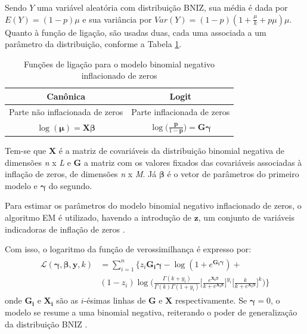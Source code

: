 \documentclass[12pt, a4paper, twoside]{report}
\numberwithin{equation}{section} %
\begin{document}
Sendo $Y$ uma variável aleatória com distribuição BNIZ, sua média é dada por $E(Y)=(1-p)\mu$ e sua variância por $Var(Y)=(1-p)(1+\frac{\mu}{k}+p\mu)\mu$. Quanto à função de ligação, são usadas duas, cada uma associada a um parâmetro da distribuição, conforme a Tabela \ref{tab:fligacao_zinb}.

\begin{table}[H]
\centering
\footnotesize
\caption{Funções de ligação para o modelo binomial negativo inflacionado de zeros}
\begin{tabular}{c|c} \hline
   \textbf{Canônica} & \textbf{Logit}  \\ \hline
    \multicolumn{1}{l|}{Parte não inflacionada de zeros} &  \multicolumn{1}{l}{Parte inflacionada de zeros} \\ \hline
   $\log{(\boldsymbol{\mu})}=\boldsymbol{X\beta}$ & $\log{ \biggl( \frac{\boldsymbol{p}}{1-\boldsymbol{p}} \biggl)}=\boldsymbol{G\gamma}$ \\ \hline
\end{tabular}
\label{tab:fligacao_zinb}
\end{table}

Tem-se que $\boldsymbol{X}$ é a matriz de covariáveis da distribuição binomial negativa de dimensões \textit{n} x \textit{L} e $\boldsymbol{G}$ a matriz com os valores fixados das covariáveis associadas à inflação de zeros, de dimensões \textit{n} x \textit{M}. Já $\boldsymbol{\beta}$ é o vetor de parâmetros do primeiro modelo e $\boldsymbol{\gamma}$ do segundo.

Para estimar os parâmetros do modelo binomial negativo inflacionado de zeros, o algoritmo EM é utilizado, havendo a introdução de $\boldsymbol{z}$, um conjunto de variáveis indicadoras de inflação de zeros \citep{fumes2009,garay2011estimation}.

Com isso, o logaritmo da função de verossimilhança é expresso por:
\begin{align}\label{ll_zinb}
\begin{split}
\mathcal{L}(\boldsymbol{\gamma},\boldsymbol{\beta},\boldsymbol{y},k)&=\sum \limits_{i=1}^{n} \biggl\{ z_i\boldsymbol{G_i\gamma}-\log(1+e^{\boldsymbol{G_i\gamma}})+ \\
&(1-z_i)\log{\biggl( \frac{\Gamma(k+y_i)}{\Gamma(k)\Gamma(1+y_i)} \biggl[ \frac{e^{\boldsymbol{X_i\beta}}}{k+e^{\boldsymbol{X_i\beta}}} \biggl]^{y_i} \biggl[ \frac{k}{k+e^{\boldsymbol{X_i\beta}}} \biggl]^k \biggl)} \biggl\}
\end{split}
\end{align}
onde $\boldsymbol{G_i}$ e $\boldsymbol{X_i}$ são as $i$-ésimas linhas de $\boldsymbol{G}$ e $\boldsymbol{X}$ respectivamente. Se $\boldsymbol{\gamma}=0$, o modelo se resume a uma binomial negativa, reiterando o poder de generalização da distribuição BNIZ \citep{sousa2022}.
\end{document}
